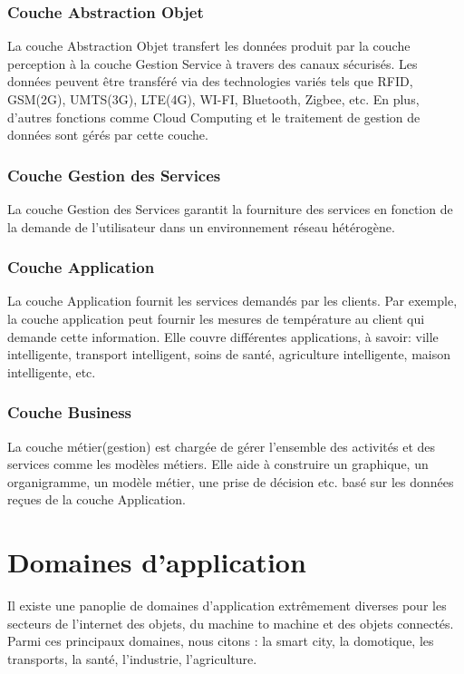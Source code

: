 	\subsubsection{Couche Abstraction Objet}
La couche Abstraction Objet transfert les données produit par la couche perception à la couche Gestion Service à travers des canaux sécurisés. Les données peuvent être transféré via des technologies variés tels que RFID, GSM(2G), UMTS(3G), LTE(4G), WI-FI, Bluetooth, Zigbee, etc. En plus, d’autres fonctions comme Cloud Computing et le traitement de gestion de données sont gérés par cette couche.\\

	\subsubsection{Couche Gestion des Services}
La couche Gestion des Services garantit la fourniture des services en fonction de la demande de l'utilisateur dans un environnement réseau hétérogène.

	\subsubsection{Couche Application}
La couche Application fournit les services demandés par les clients. Par exemple, la couche application peut fournir les mesures de température au client qui demande cette information.
Elle couvre dif{\kern0pt}férentes applications, à savoir: ville intelligente, transport intelligent, soins de santé, agriculture intelligente, maison intelligente, etc.\\

	\subsubsection{Couche Business}
La couche métier(gestion) est chargée de gérer l’ensemble des activités et des services comme les modèles métiers. Elle aide à construire un graphique, un organigramme, un modèle métier, une prise de décision etc. basé sur les données reçues de la couche Application.


	\section{Domaines d’application}
Il existe une panoplie de domaines d’application extrêmement diverses pour les secteurs de l’internet des objets, du machine to machine et des objets connectés. Parmi ces principaux domaines, nous citons : la smart city, la domotique, les transports, la santé, l’industrie, l’agriculture.\\

